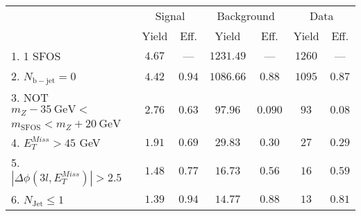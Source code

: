 \begin{tabular}{l||c|c||c|c||c|c}
\hline
 &                 \multicolumn{2}{c||}{Signal}            &  \multicolumn{2}{c||}{Background} &  \multicolumn{2}{c}{Data} \\
   & Yield & Eff. & Yield & Eff. & Yield & Eff.\\
   \hline\hline
   1. 1 SFOS &  $4.67$ &  --- &  $1231.49$ &  --- & $1260$ &  --- \\ 
   \hline
   2. $N_{\mathrm{b-jet}} = 0$ &  $4.42$ &  $0.94$ &  $1086.66$ &  $0.88$ & $1095$ &  $0.87$\\ 
   \hline
   3. NOT $m_Z - 35~\mathrm{GeV} <$  &  \multirow{2}{*}{$2.76$} &  \multirow{2}{*}{$0.63$} &  \multirow{2}{*}{$97.96$} &  \multirow{2}{*}{$0.090$} & \multirow{2}{*}{$93$} &  \multirow{2}{*}{$0.08$}\\ 
    \hfill$ m_{\mathrm{SFOS}} < m_Z + 20~\mathrm{GeV}$  & & & & &  & \\
   \hline
   4. $E_{T}^{Miss} > 45$ GeV &  $1.91$ &  $0.69$ &  $29.83$ &  $0.30$ & $27$ &  $0.29$\\ 
   \hline
   5. $|\Delta\phi(3l,E_{T}^{Miss})| > 2.5$ &  $1.48$ &  $0.77$ &  $16.73$ &  $0.56$ & $16$ &  $0.59$\\ 
   \hline
   6. $N_{\mathrm{Jet}} \leq 1$ &  $1.39$ &  $0.94$ &  $14.77$ &  $0.88$ & $13$ &  $0.81$\\ 
   \hline
   \end{tabular}
